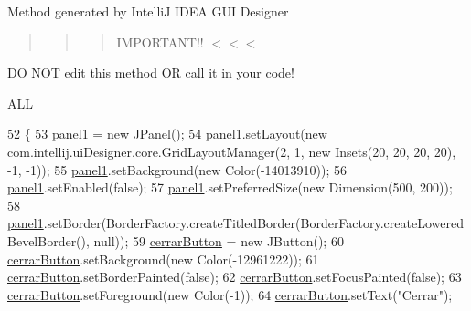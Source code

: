 Method generated by IntelliJ I\+D\+EA G\+UI Designer \begin{quote}
\begin{quote}
\begin{quote}
I\+M\+P\+O\+R\+T\+A\+N\+T!! $<$$<$$<$ \end{quote}
\end{quote}
\end{quote}
DO N\+OT edit this method OR call it in your code!

A\+LL 
\begin{DoxyCode}
52                                  \{
53         \hyperlink{classpresentacion_1_1form_1_1PopUp__Estadistica_ac276266d42b873f89883dd3a869feadf}{panel1} = \textcolor{keyword}{new} JPanel();
54         \hyperlink{classpresentacion_1_1form_1_1PopUp__Estadistica_ac276266d42b873f89883dd3a869feadf}{panel1}.setLayout(\textcolor{keyword}{new} com.intellij.uiDesigner.core.GridLayoutManager(2, 1, \textcolor{keyword}{new} Insets(20, 20, 
      20, 20), -1, -1));
55         \hyperlink{classpresentacion_1_1form_1_1PopUp__Estadistica_ac276266d42b873f89883dd3a869feadf}{panel1}.setBackground(\textcolor{keyword}{new} Color(-14013910));
56         \hyperlink{classpresentacion_1_1form_1_1PopUp__Estadistica_ac276266d42b873f89883dd3a869feadf}{panel1}.setEnabled(\textcolor{keyword}{false});
57         \hyperlink{classpresentacion_1_1form_1_1PopUp__Estadistica_ac276266d42b873f89883dd3a869feadf}{panel1}.setPreferredSize(\textcolor{keyword}{new} Dimension(500, 200));
58         \hyperlink{classpresentacion_1_1form_1_1PopUp__Estadistica_ac276266d42b873f89883dd3a869feadf}{panel1}.setBorder(BorderFactory.createTitledBorder(BorderFactory.createLoweredBevelBorder(), 
      null));
59         \hyperlink{classpresentacion_1_1form_1_1PopUp__Estadistica_aad708c3569f3d964b09867708ba60bf6}{cerrarButton} = \textcolor{keyword}{new} JButton();
60         \hyperlink{classpresentacion_1_1form_1_1PopUp__Estadistica_aad708c3569f3d964b09867708ba60bf6}{cerrarButton}.setBackground(\textcolor{keyword}{new} Color(-12961222));
61         \hyperlink{classpresentacion_1_1form_1_1PopUp__Estadistica_aad708c3569f3d964b09867708ba60bf6}{cerrarButton}.setBorderPainted(\textcolor{keyword}{false});
62         \hyperlink{classpresentacion_1_1form_1_1PopUp__Estadistica_aad708c3569f3d964b09867708ba60bf6}{cerrarButton}.setFocusPainted(\textcolor{keyword}{false});
63         \hyperlink{classpresentacion_1_1form_1_1PopUp__Estadistica_aad708c3569f3d964b09867708ba60bf6}{cerrarButton}.setForeground(\textcolor{keyword}{new} Color(-1));
64         \hyperlink{classpresentacion_1_1form_1_1PopUp__Estadistica_aad708c3569f3d964b09867708ba60bf6}{cerrarButton}.setText(\textcolor{stringliteral}{"Cerrar"});

\end{DoxyCode}
